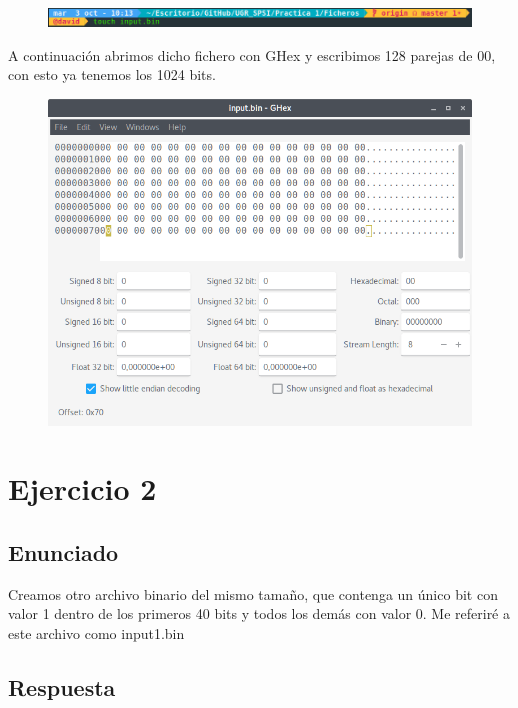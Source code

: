 \documentclass[10pt,a4paper,spanish]{report}
\begin{document}
\begin{figure}[!hbp]
 \centering  \includegraphics[width=1\textwidth]{./Imagenes/1.png}
\end{figure}

\noindent
A continuación abrimos dicho fichero con GHex y escribimos 128 parejas de 00, con esto ya tenemos los 1024 bits.

\begin{figure}[!hbp]
 \centering  \includegraphics[width=1\textwidth]{./Imagenes/2.png}
\end{figure}


\chapter{Ejercicio 2}

\section{Enunciado}
\noindent
Creamos otro archivo binario del mismo tamaño, que contenga un único bit con valor 1 dentro de los primeros 40 bits y todos los demás con valor 0. Me referiré a este archivo como input1.bin

\section{Respuesta}
\end{document}
